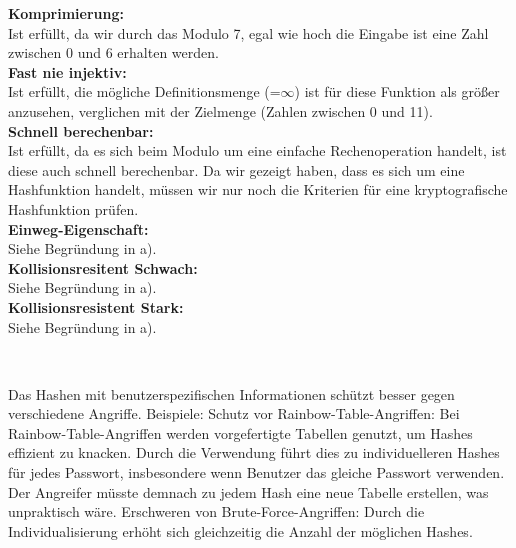 \documentclass[german]{../uebung}
\begin{document}
\begin{exercise}{1}
    \textbf{Komprimierung:}\\
    Ist erfüllt, da wir durch das Modulo 7, egal wie hoch die Eingabe ist eine Zahl zwischen 0 und 6 erhalten werden.\\
    \textbf{Fast nie injektiv:}\\
    Ist erfüllt, die mögliche Definitionsmenge (=\(\infty\)) ist für diese Funktion als größer anzusehen, verglichen mit der Zielmenge (Zahlen zwischen 0 und 11).\\
    \textbf{Schnell berechenbar:}\\
    Ist erfüllt, da es sich beim Modulo um eine einfache Rechenoperation handelt, ist diese auch schnell berechenbar.
    Da wir gezeigt haben, dass es sich um eine Hashfunktion handelt, müssen wir nur noch die Kriterien für eine kryptografische Hashfunktion prüfen.\\
    \textbf{Einweg-Eigenschaft:}\\
    Siehe Begründung in a).\\
    \textbf{Kollisionsresitent Schwach:}\\
    Siehe Begründung in a).\\
    \textbf{Kollisionsresistent Stark:}\\
    Siehe Begründung in a).\\
\end{exercise}\\

\begin{exercise}{2}
    Das Hashen mit benutzerspezifischen Informationen schützt besser gegen verschiedene Angriffe. Beispiele:
    Schutz vor Rainbow-Table-Angriffen: Bei Rainbow-Table-Angriffen werden vorgefertigte Tabellen genutzt, um Hashes effizient zu knacken. Durch die Verwendung führt dies zu individuelleren Hashes für jedes Passwort, insbesondere wenn Benutzer das gleiche Passwort verwenden. Der Angreifer müsste demnach zu jedem Hash eine neue Tabelle erstellen, was unpraktisch wäre.
    Erschweren von Brute-Force-Angriffen: Durch die Individualisierung erhöht sich gleichzeitig die Anzahl der möglichen Hashes.\\
\end{exercise}
\end{document}
